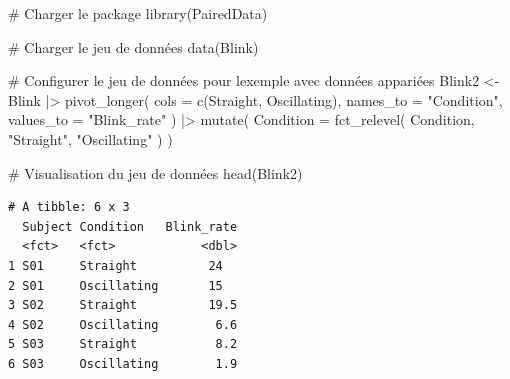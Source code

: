 \documentclass[
  letterpaper,
]{book}
\newenvironment{Shaded}{\begin{snugshade}}{\end{snugshade}}
\newcommand{\AttributeTok}[1]{\textcolor[rgb]{0.40,0.45,0.13}{#1}}
\newcommand{\CommentTok}[1]{\textcolor[rgb]{0.37,0.37,0.37}{#1}}
\newcommand{\FunctionTok}[1]{\textcolor[rgb]{0.28,0.35,0.67}{#1}}
\newcommand{\NormalTok}[1]{\textcolor[rgb]{0.00,0.23,0.31}{#1}}
\newcommand{\OtherTok}[1]{\textcolor[rgb]{0.00,0.23,0.31}{#1}}
\newcommand{\SpecialCharTok}[1]{\textcolor[rgb]{0.37,0.37,0.37}{#1}}
\newcommand{\StringTok}[1]{\textcolor[rgb]{0.13,0.47,0.30}{#1}}
\begin{document}
\begin{Shaded}
\begin{Highlighting}[]
\CommentTok{\# Charger le package}
\FunctionTok{library}\NormalTok{(PairedData)}

\CommentTok{\# Charger le jeu de données}
\FunctionTok{data}\NormalTok{(Blink)}

\CommentTok{\# Configurer le jeu de données pour l\textquotesingle{}exemple avec données appariées}
\NormalTok{Blink2 }\OtherTok{\textless{}{-}}
\NormalTok{  Blink }\SpecialCharTok{|\textgreater{}}
  \FunctionTok{pivot\_longer}\NormalTok{(}
    \AttributeTok{cols =} \FunctionTok{c}\NormalTok{(Straight, Oscillating),}
    \AttributeTok{names\_to =} \StringTok{"Condition"}\NormalTok{, }
    \AttributeTok{values\_to =} \StringTok{"Blink\_rate"}
\NormalTok{    ) }\SpecialCharTok{|\textgreater{}}
  \FunctionTok{mutate}\NormalTok{(}
    \AttributeTok{Condition =} \FunctionTok{fct\_relevel}\NormalTok{(}
\NormalTok{      Condition, }\StringTok{"Straight"}\NormalTok{, }\StringTok{"Oscillating"}
\NormalTok{      )}
\NormalTok{    )}

\CommentTok{\# Visualisation du jeu de données}
\FunctionTok{head}\NormalTok{(Blink2)}
\end{Highlighting}
\end{Shaded}

\begin{verbatim}
# A tibble: 6 x 3
  Subject Condition   Blink_rate
  <fct>   <fct>            <dbl>
1 S01     Straight          24  
2 S01     Oscillating       15  
3 S02     Straight          19.5
4 S02     Oscillating        6.6
5 S03     Straight           8.2
6 S03     Oscillating        1.9
\end{verbatim}
\end{document}
